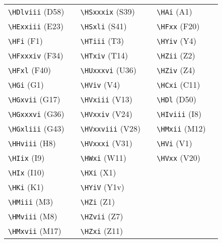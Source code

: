 \documentclass{article}
\begin{document}
\begin{table}
\begin{tabular}{|l|c||l|c||l|c|}
\verb|\HDlviii| (D58) & \textpmhg{\HDlviii}   & \verb|\HSxxxix| (S39)  & \textpmhg{\HSxxxix}  & \verb|\HAi| (A1)      & \textpmhg{\HAi} \\
\verb|\HExxiii| (E23) & \textpmhg{\HExxiii}   & \verb|\HSxli| (S41)    & \textpmhg{\HSxli}    & \verb|\HFxx| (F20)    & \textpmhg{\HFxx} \\
\verb|\HFi| (F1)      & \textpmhg{\HFi}       & \verb|\HTiii| (T3)     & \textpmhg{\HTiii}    & \verb|\HYiv| (Y4)     & \textpmhg{\HYiv} \\
\verb|\HFxxxiv| (F34) & \textpmhg{\HFxxxiv}   & \verb|\HTxiv| (T14)    & \textpmhg{\HTxiv}    & \verb|\HZii| (Z2)     & \textpmhg{\HZii}  \\
\verb|\HFxl| (F40)    & \textpmhg{\HFxl}      & \verb|\HUxxxvi| (U36)  & \textpmhg{\HUxxxvi}  & \verb|\HZiv| (Z4)     & \textpmhg{\HZiv} \\
\verb|\HGi| (G1)      & \textpmhg{\HGi}       & \verb|\HViv| (V4)      & \textpmhg{\HViv}     & \verb|\HCxi| (C11)    & \textpmhg{\HCxi} \\
\verb|\HGxvii| (G17)  & \textpmhg{\HGxvii}    & \verb|\HVxiii| (V13)   & \textpmhg{\HVxiii}   & \verb|\HDl| (D50)     & \textpmhg{\HDl} \\
\verb|\HGxxxvi| (G36) & \textpmhg{\HGxxxvi}   & \verb|\HVxxiv| (V24)   & \textpmhg{\HVxxiv}   & \verb|\HIviii| (I8)   & \textpmhg{\HIviii} \\
\verb|\HGxliii| (G43) & \textpmhg{\HGxliii}   & \verb|\HVxxviii| (V28) & \textpmhg{\HVxxviii} & \verb|\HMxii| (M12)   & \textpmhg{\HMxii} \\
\verb|\HHviii| (H8)   & \textpmhg{\HHviii}    & \verb|\HVxxxi| (V31)   & \textpmhg{\HVxxxi}   & \verb|\HVi| (V1)      & \textpmhg{\HVi} \\
\verb|\HIix| (I9)     & \textpmhg{\HIix}      & \verb|\HWxi| (W11)     & \textpmhg{\HWxi}     & \verb|\HVxx| (V20)    & \textpmhg{\HVxx} \\
\verb|\HIx| (I10)     & \textpmhg{\HIx}       & \verb|\HXi| (X1)       & \textpmhg{\HXi} &  &  \\
\verb|\HKi| (K1)      & \textpmhg{\HKi}       & \verb|\HYiV| (Y1v)     & \textpmhg{\HYiV} &  &  \\
\verb|\HMiii| (M3)    & \textpmhg{\HMiii}     & \verb|\HZi| (Z1)       & \textpmhg{\HZi} &  &  \\
\verb|\HMviii| (M8)   & \textpmhg{\HMviii}    & \verb|\HZvii| (Z7)     & \textpmhg{\HZvii} &  &  \\
\verb|\HMxvii| (M17)  & \textpmhg{\HMxvii}    & \verb|\HZxi| (Z11)     & \textpmhg{\HZxi} &  &  \\
\hline
\end{tabular}
\end{table}
\end{document}
